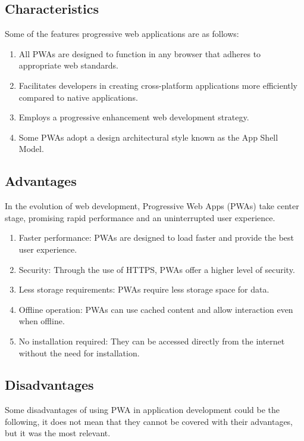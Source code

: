 \documentclass[12pt,a4paper, twosite]{article}
\begin{document}
	\subsection{Characteristics}
	\label{sec:product-functions}
	Some of the features progressive web applications are as follows:

\begin{enumerate}
	\item All PWAs are designed to function in any browser that adheres to appropriate web standards.
	
	\item Facilitates developers in creating cross-platform applications more efficiently compared to native applications.
	
	\item Employs a progressive enhancement web development strategy.
	
	\item Some PWAs adopt a design architectural style known as the App Shell Model.
\end{enumerate}
	
	\subsection{Advantages}
	\label{sec:user-characteristics}
	In the evolution of web development, Progressive Web Apps (PWAs) take center stage, promising rapid performance and an uninterrupted user experience.
\begin{enumerate}
	\item Faster performance: PWAs are designed to load faster and provide the best user experience.
	
	\item Security: Through the use of HTTPS, PWAs offer a higher level of security.
	
	\item Less storage requirements: PWAs require less storage space for data.
	
	\item Offline operation: PWAs can use cached content and allow interaction even when offline.
	
	\item No installation required: They can be accessed directly from the internet without the need for installation.
\end{enumerate}
	
	\subsection{Disadvantages}
	\label{sec:constraints}
	Some disadvantages of using PWA in application development could be the following, it does not mean that they cannot be covered with their advantages, but it was the most relevant.
	
\end{document}
